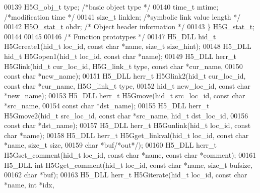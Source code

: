 \begin{DoxyCode}
00139     H5G\_obj\_t       type;       \textcolor{comment}{/*basic object type     */}
00140     time\_t      mtime;      \textcolor{comment}{/*modification time     */}
00141     \textcolor{keywordtype}{size\_t}      linklen;    \textcolor{comment}{/*symbolic link value length    */}
00142     \hyperlink{struct_h5_o__stat__t}{H5O\_stat\_t}          ohdr;           \textcolor{comment}{/* Object header information    */}
00143 \} \hyperlink{struct_h5_g__stat__t}{H5G\_stat\_t};
00144 
00145 
00146 \textcolor{comment}{/* Function prototypes */}
00147 H5\_DLL hid\_t H5Gcreate1(hid\_t loc\_id, \textcolor{keyword}{const} \textcolor{keywordtype}{char} *name, \textcolor{keywordtype}{size\_t} size\_hint);
00148 H5\_DLL hid\_t H5Gopen1(hid\_t loc\_id, \textcolor{keyword}{const} \textcolor{keywordtype}{char} *name);
00149 H5\_DLL herr\_t H5Glink(hid\_t cur\_loc\_id, H5G\_link\_t type, \textcolor{keyword}{const} \textcolor{keywordtype}{char} *cur\_name,
00150     \textcolor{keyword}{const} \textcolor{keywordtype}{char} *new\_name);
00151 H5\_DLL herr\_t H5Glink2(hid\_t cur\_loc\_id, \textcolor{keyword}{const} \textcolor{keywordtype}{char} *cur\_name, H5G\_link\_t type,
00152     hid\_t new\_loc\_id, \textcolor{keyword}{const} \textcolor{keywordtype}{char} *new\_name);
00153 H5\_DLL herr\_t H5Gmove(hid\_t src\_loc\_id, \textcolor{keyword}{const} \textcolor{keywordtype}{char} *src\_name,
00154     \textcolor{keyword}{const} \textcolor{keywordtype}{char} *dst\_name);
00155 H5\_DLL herr\_t H5Gmove2(hid\_t src\_loc\_id, \textcolor{keyword}{const} \textcolor{keywordtype}{char} *src\_name, hid\_t dst\_loc\_id,
00156     \textcolor{keyword}{const} \textcolor{keywordtype}{char} *dst\_name);
00157 H5\_DLL herr\_t H5Gunlink(hid\_t loc\_id, \textcolor{keyword}{const} \textcolor{keywordtype}{char} *name);
00158 H5\_DLL herr\_t H5Gget\_linkval(hid\_t loc\_id, \textcolor{keyword}{const} \textcolor{keywordtype}{char} *name, \textcolor{keywordtype}{size\_t} size,
00159     \textcolor{keywordtype}{char} *buf\textcolor{comment}{/*out*/});
00160 H5\_DLL herr\_t H5Gset\_comment(hid\_t loc\_id, \textcolor{keyword}{const} \textcolor{keywordtype}{char} *name, \textcolor{keyword}{const} \textcolor{keywordtype}{char} *comment);
00161 H5\_DLL \textcolor{keywordtype}{int} H5Gget\_comment(hid\_t loc\_id, \textcolor{keyword}{const} \textcolor{keywordtype}{char} *name, \textcolor{keywordtype}{size\_t} bufsize,
00162     \textcolor{keywordtype}{char} *buf);
00163 H5\_DLL herr\_t H5Giterate(hid\_t loc\_id, \textcolor{keyword}{const} \textcolor{keywordtype}{char} *name, \textcolor{keywordtype}{int} *idx,

\end{DoxyCode}
